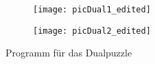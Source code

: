 \documentclass[seminar,german]{algothesis}
\begin{document}
\begin{figure}[ht]
	\centering
	\begin{subfigure}{.4\textwidth}
		\texttt{[image: picDual1\_edited]}
    \end{subfigure}%
    \begin{subfigure}{.4\textwidth}
		\texttt{[image: picDual2\_edited]}
    \end{subfigure}
    \caption{Programm für das Dualpuzzle}
	\label{fig:6}
\end{figure}





\clearpage
\nocite{*}
\printbibliography
\end{document}

